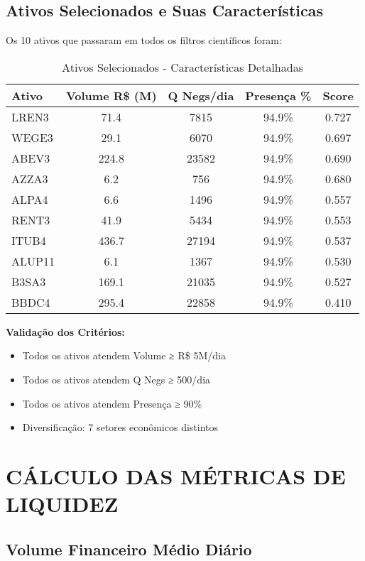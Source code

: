 \subsection{Ativos Selecionados e Suas Características}

Os 10 ativos que passaram em todos os filtros científicos foram:

\begin{table}[H]
\centering
\caption{Ativos Selecionados - Características Detalhadas}
\begin{tabular}{|l|c|c|c|c|}
\hline
\textbf{Ativo} & \textbf{Volume R\$ (M)} & \textbf{Q Negs/dia} & \textbf{Presença \%} & \textbf{Score} \\
\hline
LREN3 & 71.4 & 7815 & 94.9\% & 0.727 \\
WEGE3 & 29.1 & 6070 & 94.9\% & 0.697 \\
ABEV3 & 224.8 & 23582 & 94.9\% & 0.690 \\
AZZA3 & 6.2 & 756 & 94.9\% & 0.680 \\
ALPA4 & 6.6 & 1496 & 94.9\% & 0.557 \\
RENT3 & 41.9 & 5434 & 94.9\% & 0.553 \\
ITUB4 & 436.7 & 27194 & 94.9\% & 0.537 \\
ALUP11 & 6.1 & 1367 & 94.9\% & 0.530 \\
B3SA3 & 169.1 & 21035 & 94.9\% & 0.527 \\
BBDC4 & 295.4 & 22858 & 94.9\% & 0.410 \\
\hline
\end{tabular}
\end{table}

\textbf{Validação dos Critérios:}
\begin{itemize}
    \item Todos os ativos atendem Volume ≥ R\$ 5M/dia
    \item Todos os ativos atendem Q Negs ≥ 500/dia
    \item Todos os ativos atendem Presença ≥ 90\%
    \item Diversificação: 7 setores econômicos distintos
\end{itemize}

\section{CÁLCULO DAS MÉTRICAS DE LIQUIDEZ}

\subsection{Volume Financeiro Médio Diário}

